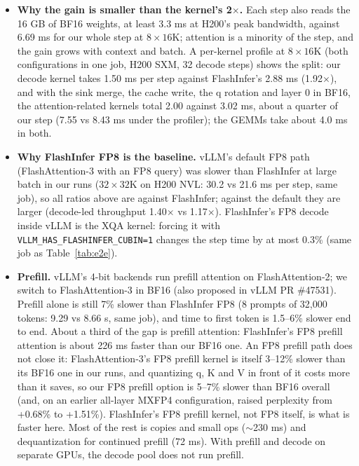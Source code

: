 \documentclass[11pt]{article}
\begin{document}
\begin{itemize}
  \item \textbf{Why the gain is smaller than the kernel's 2$\times$.} Each step also reads the 16 GB of BF16 weights, at least 3.3 ms at H200's peak bandwidth, against 6.69 ms for our whole step at $8 \times 16$K; attention is a minority of the step, and the gain grows with context and batch. A per-kernel profile at $8 \times 16$K (both configurations in one job, H200 SXM, 32 decode steps) shows the split: our decode kernel takes 1.50 ms per step against FlashInfer's 2.88 ms (1.92$\times$), and with the sink merge, the cache write, the q rotation and layer 0 in BF16, the attention-related kernels total 2.00 against 3.02 ms, about a quarter of our step (7.55 vs 8.43 ms under the profiler); the GEMMs take about 4.0 ms in both.
  \item \textbf{Why FlashInfer FP8 is the baseline.} vLLM's default FP8 path (FlashAttention-3 with an FP8 query) was slower than FlashInfer at large batch in our runs ($32 \times 32$K on H200 NVL: 30.2 vs 21.6 ms per step, same job), so all ratios above are against FlashInfer; against the default they are larger (decode-led throughput 1.40$\times$ vs 1.17$\times$). FlashInfer's FP8 decode inside vLLM is the XQA kernel: forcing it with \texttt{VLLM\_HAS\_FLASHINFER\_CUBIN=1} changes the step time by at most 0.3\% (same job as Table~\ref{tab:e2e}).
  \item \textbf{Prefill.} vLLM's 4-bit backends run prefill attention on FlashAttention-2; we switch to FlashAttention-3 in BF16 (also proposed in vLLM PR \#47531). Prefill alone is still 7\% slower than FlashInfer FP8 (8 prompts of 32,000 tokens: 9.29 vs 8.66 s, same job), and time to first token is 1.5--6\% slower end to end. About a third of the gap is prefill attention: FlashInfer's FP8 prefill attention is about 226 ms faster than our BF16 one. An FP8 prefill path does not close it: FlashAttention-3's FP8 prefill kernel is itself 3--12\% slower than its BF16 one in our runs, and quantizing q, K and V in front of it costs more than it saves, so our FP8 prefill option is 5--7\% slower than BF16 overall (and, on an earlier all-layer MXFP4 configuration, raised perplexity from +0.68\% to +1.51\%). FlashInfer's FP8 prefill kernel, not FP8 itself, is what is faster here. Most of the rest is copies and small ops ($\sim$230 ms) and dequantization for continued prefill (72 ms). With prefill and decode on separate GPUs, the decode pool does not run prefill.
\end{itemize}
\end{document}
